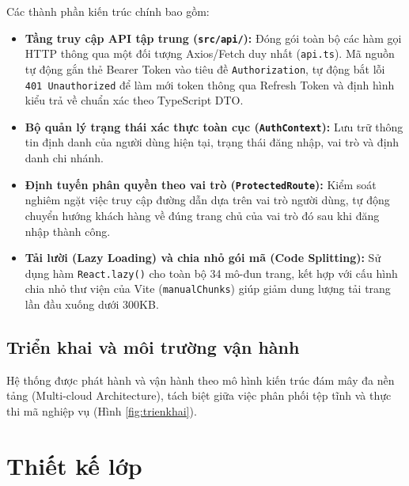Các thành phần kiến trúc chính bao gồm:
\begin{itemize}
    \item \textbf{Tầng truy cập API tập trung (\texttt{src/api/}):} Đóng gói toàn bộ các hàm gọi HTTP thông qua một đối tượng Axios/Fetch duy nhất (\texttt{api.ts}). Mã nguồn tự động gắn thẻ Bearer Token vào tiêu đề \texttt{Authorization}, tự động bắt lỗi \texttt{401 Unauthorized} để làm mới token thông qua Refresh Token và định hình kiểu trả về chuẩn xác theo TypeScript DTO.
    \item \textbf{Bộ quản lý trạng thái xác thực toàn cục (\texttt{AuthContext}):} Lưu trữ thông tin định danh của người dùng hiện tại, trạng thái đăng nhập, vai trò và định danh chi nhánh.
    \item \textbf{Định tuyến phân quyền theo vai trò (\texttt{ProtectedRoute}):} Kiểm soát nghiêm ngặt việc truy cập đường dẫn dựa trên vai trò người dùng, tự động chuyển hướng khách hàng về đúng trang chủ của vai trò đó sau khi đăng nhập thành công.
    \item \textbf{Tải lười (Lazy Loading) và chia nhỏ gói mã (Code Splitting):} Sử dụng hàm \texttt{React.lazy()} cho toàn bộ 34 mô-đun trang, kết hợp với cấu hình chia nhỏ thư viện của Vite (\texttt{manualChunks}) giúp giảm dung lượng tải trang lần đầu xuống dưới 300KB.
\end{itemize}

\subsection{Triển khai và môi trường vận hành}
\label{ssec:trienkhai_tong}
Hệ thống được phát hành và vận hành theo mô hình kiến trúc đám mây đa nền tảng (Multi-cloud Architecture), tách biệt giữa việc phân phối tệp tĩnh và thực thi mã nghiệp vụ (Hình \ref{fig:trienkhai}).


\section{Thiết kế lớp}
\label{sec:thietke_lop}

